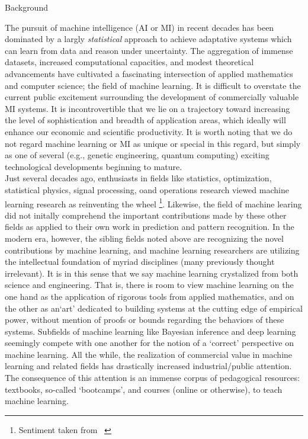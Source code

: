 \documentclass[10pt]{article}
\newenvironment{changemargin}[2]{%
\begin{list}{}{%
\setlength{\topsep}{0pt}%
\setlength{\leftmargin}{#1}%
\setlength{\rightmargin}{#2}%
\setlength{\listparindent}{\parindent}%
\setlength{\itemindent}{\parindent}%
\setlength{\parsep}{\parskip}%
}%
\item[]}{\end{list}}
\renewcommand{\it}{\textit}
\begin{document}
\begin{changemargin}{+-1cm}{-3cm}
\vspace{1cm}
\noindent
\large{Background}\\
\small

\noindent
The pursuit of machine intelligence (AI or MI) in recent decades has been dominated by a largly \it{statistical} approach to achieve adaptative systems which can learn from data and reason under uncertainty. The aggregation of immense datasets, increased computational capacities, and modest theoretical advancements have cultivated a fascinating intersection of applied mathematics and computer science; the field of machine learning. It is difficult to overstate the current public excitement surrounding the development of commercially valuable MI systems. It is incontrovertible that we lie on a trajectory toward increasing the level of sophistication and breadth of application areas, which ideally will enhance our economic and scientific productivity. It is worth noting that we do not regard machine learning or MI as unique or special in this regard, but simply as one of several (e.g., genetic engineering, quantum computing) exciting technological developments beginning to mature. \\

Just several decades ago, enthusiasts in fields like statistics, optimization, statistical physics, signal processing, oand operations research viewed machine learning research as reinventing the wheel \footnote{Sentiment taken from ~\cite{wasserman2013all}}. Likewise, the field of machine learing did not initally comprehend the important contributions made by these other fields as applied to their own work in prediction and pattern recognition. In the modern era, however, the sibling fields noted above are recognizing the novel contributions by machine learning, and machine learning researchers are utilizing the intellectual foundation of myriad disciplines (many previously thought irrelevant). It is in this sense that we say machine learning crystalized from both science and engineering. That is, there is room to view machine learning on the one hand as the application of rigorous tools from applied mathematics, and on the other as an`art' dedicated to building systems at the cutting edge of empirical power, without mention of proofs or bounds regarding the behaviors of these systems. Subfields of machine learning like Bayesian inference and deep learning seemingly compete with one another for the notion of a `correct' perspective on machine learning. All the while, the realization of commercial value in machine learning and related fields has drastically increased industrial/public attention. The consequence of this attention is an immense corpus of pedagogical resources: textbooks, so-called `bootcamps', and courses (online or otherwise), to teach machine learning. \\


\end{changemargin}
\end{document}
